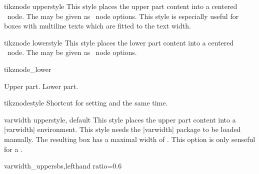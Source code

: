 \clearpage
\begin{docTcbKey}{tikznode upper}{}{style}
  This style places the upper part content into a centered
  \tikzname\  node. The  may be given as \tikzname\  node options.
  This style is especially useful for boxes with multiline texts which are
  fitted to the text width.
\end{docTcbKey}

\begin{docTcbKey}{tikznode lower}{}{style}
  This style places the lower part content into a centered
  \tikzname\ node. The  may be given as \tikzname\  node options.
\begin{exdispExample}{tikznode_lower}
\begin{tcolorbox}[bicolor,colback=LightBlue!50!white,colbacklower=white,
  colframe=black,tikznode lower={inner sep=2pt,draw=red,fill=yellow}]
Upper part.
\tcblower
Lower part.
\end{tcolorbox}
\end{exdispExample}
\end{docTcbKey}

\begin{docTcbKey}{tikznode}{}{style}
  Shortcut for setting  and 
  the same time.
\end{docTcbKey}


\begin{docTcbKey}{varwidth upper}{}{style, default }
  This style places the upper part content into a |varwidth| environment.
  This style needs the |varwidth| package \cite{arseneau:2011a} to be loaded manually.
  The resulting box has a maximal width of .
  This option is only senseful for a .
\begin{exdispExample*}{varwidth_upper}{sbs,lefthand ratio=0.6}

\end{exdispExample*}
\end{docTcbKey}



